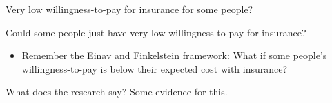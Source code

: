 \begin{frame}{Very low willingness-to-pay for insurance for some people?}

    Could some people just have very low willingness-to-pay for insurance?
    \begin{itemize}
        \item Remember the Einav and Finkelstein framework:
        What if some people's willingness-to-pay is below their expected cost with insurance?
    \end{itemize}
    \vspace{5mm}

    What does the research say? \pause Some evidence for this.

\end{frame}







